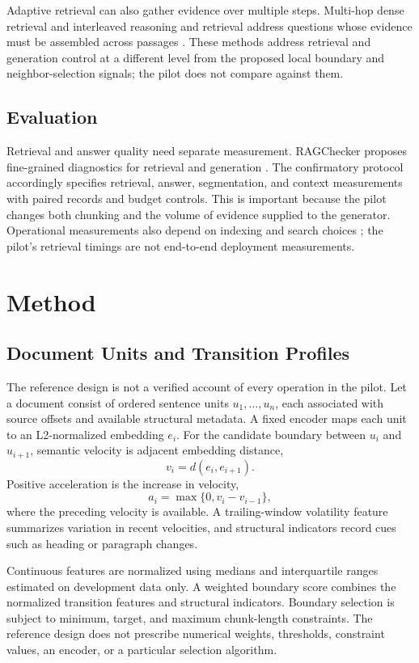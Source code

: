 \documentclass[10pt]{article}
\begin{document}
Adaptive retrieval can also gather evidence over multiple steps. Multi-hop dense retrieval and interleaved reasoning and retrieval address questions whose evidence must be assembled across passages \cite{Xiong2020AnsweringComplex,Trivedi2022InterleavingRetrieval}. These methods address retrieval and generation control at a different level from the proposed local boundary and neighbor-selection signals; the pilot does not compare against them.

\subsection{Evaluation}

Retrieval and answer quality need separate measurement. RAGChecker proposes fine-grained diagnostics for retrieval and generation \cite{Ru2024RagcheckerFinegrained}. The confirmatory protocol accordingly specifies retrieval, answer, segmentation, and context measurements with paired records and budget controls. This is important because the pilot changes both chunking and the volume of evidence supplied to the generator. Operational measurements also depend on indexing and search choices \cite{Aumller2018AnnbenchmarksBenchmarking}; the pilot's retrieval timings are not end-to-end deployment measurements.

\section{Method}
\label{sec:method}

\subsection{Document Units and Transition Profiles}

The reference design is not a verified account of every operation in the pilot. Let a document consist of ordered sentence units $u_1,\ldots,u_n$, each associated with source offsets and available structural metadata. A fixed encoder maps each unit to an L2-normalized embedding $e_i$. For the candidate boundary between $u_i$ and $u_{i+1}$, semantic velocity is adjacent embedding distance,
\[
v_i=d(e_i,e_{i+1}).
\]
Positive acceleration is the increase in velocity,
\[
a_i=\max\{0,v_i-v_{i-1}\},
\]
where the preceding velocity is available. A trailing-window volatility feature summarizes variation in recent velocities, and structural indicators record cues such as heading or paragraph changes.

Continuous features are normalized using medians and interquartile ranges estimated on development data only. A weighted boundary score combines the normalized transition features and structural indicators. Boundary selection is subject to minimum, target, and maximum chunk-length constraints. The reference design does not prescribe numerical weights, thresholds, constraint values, an encoder, or a particular selection algorithm.
\end{document}
